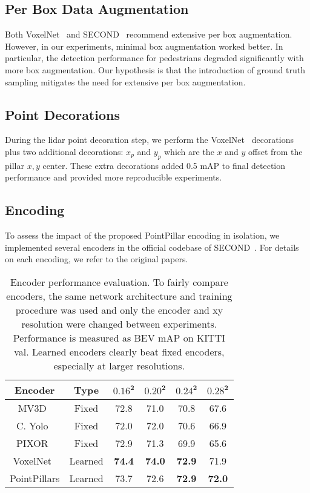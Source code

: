 \documentclass[10pt,twocolumn,letterpaper]{article}
\newcommand{\squeeze}{\vspace{-0.5mm}}
\begin{document}
\squeeze
\subsection{Per Box Data Augmentation}
\squeeze
\label{sec:box_aug}
Both VoxelNet~\cite{voxelnet} and SECOND~\cite{second} recommend extensive per box augmentation.
However, in our experiments, minimal box augmentation worked better.
In particular, the detection performance for pedestrians degraded significantly with more box augmentation.
Our hypothesis is that the introduction of ground truth sampling mitigates the need for extensive per box augmentation.

\squeeze
\subsection{Point Decorations}
\squeeze
\label{sec:decoration}
During the lidar point decoration step, we perform the VoxelNet~\cite{voxelnet} decorations plus two additional decorations:
$x_{p}$ and $y_{p}$ which are the $x$ and $y$ offset from the pillar $x, y$ center.
These extra decorations added 0.5 mAP to final detection performance and provided more reproducible experiments.

\squeeze
\subsection{Encoding}
\squeeze
\label{sec:encoding}
To assess the impact of the proposed PointPillar encoding in isolation, we implemented several encoders in the official codebase of SECOND~\cite{second}.
For details on each encoding, we refer to the original papers.
\begin{table}[]
\small
\begin{tabular}{*{6}{| c} |}
\hline
\textbf{Encoder} 				& \textbf{Type}		& $\mathbf{0.16^2}$ 		&$\mathbf{0.20^2}$  		& $\mathbf{0.24^2}$		& $\mathbf{0.28^2}$		\\ \hline \hline 
MV3D~\cite{mv3d}				& Fixed			& 72.8				& 71.0				& 70.8			& 67.6			\\ \hline
C. Yolo~\cite{complexyolo}		& Fixed			& 72.0		    		& 72.0				& 70.6			& 66.9			\\ \hline
PIXOR~\cite{pixor} 				& Fixed			& 72.9		    		& 71.3				& 69.9			& 65.6			\\ \hline \hline
VoxelNet~\cite{voxelnet}			& Learned			& \textbf{74.4}				& \textbf{74.0}				& \textbf{72.9}			& 71.9 	\\ \hline
PointPillars					& Learned			& 73.7				& 72.6				& \textbf{72.9}			& \textbf{72.0}			\\ \hline
\end{tabular}
\caption{Encoder performance evaluation.
To fairly compare encoders, the same network architecture and training procedure was used and only the encoder and xy resolution were changed between experiments.
Performance is measured as BEV mAP on KITTI val.
Learned encoders clearly beat fixed encoders, especially at larger resolutions.
}
\label{table:encode}
\end{table}
\end{document}
